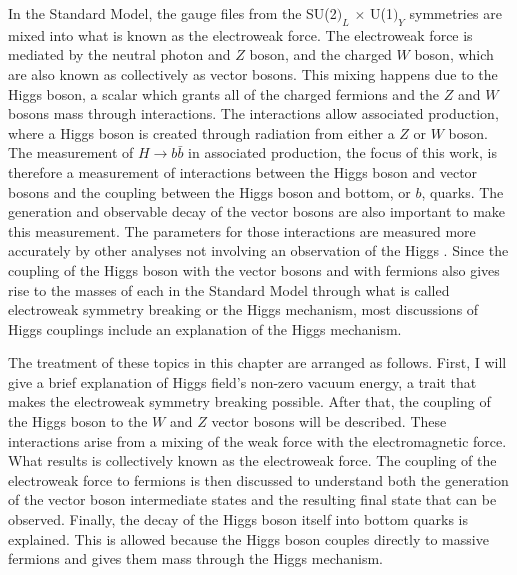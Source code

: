 In the Standard Model, the gauge files from the SU(2$)_L$ $\times$ U(1$)_Y$ symmetries are mixed
into what is known as the electroweak force.
The electroweak force is mediated by the neutral photon and $Z$ boson, and the charged $W$ boson,
which are also known as collectively as vector bosons.
This mixing happens due to the Higgs boson, a scalar which grants all of the charged fermions and
the $Z$ and $W$ bosons mass through interactions.
The interactions allow associated production,
where a Higgs boson is created through radiation from either a $Z$ or $W$ boson.
The measurement of $H\rightarrow b\bar{b}$ in associated production,
the focus of this work,
is therefore a measurement of interactions between the Higgs boson and vector bosons
and the coupling between the Higgs boson and bottom, or $b$, quarks.
The generation and observable decay of the vector bosons are also important to make this measurement.
The parameters for those interactions are measured more accurately by other analyses
not involving an observation of the Higgs \cite{sabrandt}.
Since the coupling of the Higgs boson with the vector bosons and with fermions also gives rise to the masses
of each in the Standard Model through what is called electroweak symmetry breaking or the Higgs mechanism,
most discussions of Higgs couplings include an explanation of the Higgs mechanism.

The treatment of these topics in this chapter are arranged as follows.
First, I will give a brief explanation of Higgs field's non-zero vacuum energy,
a trait that makes the electroweak symmetry breaking possible.
After that, the coupling of the Higgs boson to the $W$ and $Z$ vector bosons will be described.
These interactions arise from a mixing of the weak force with the electromagnetic force.
What results is collectively known as the electroweak force.
The coupling of the electroweak force to fermions is then discussed to
understand both the generation of the vector boson intermediate states and
the resulting final state that can be observed.
Finally, the decay of the Higgs boson itself into bottom quarks is explained.
This is allowed because the Higgs boson couples directly to massive fermions
and gives them mass through the Higgs mechanism.

